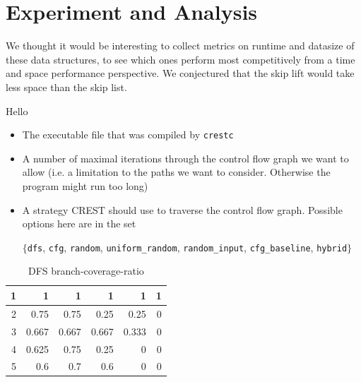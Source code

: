 \documentclass[oribibl]{llncs}
\begin{document}
 \section{Experiment and Analysis}
\label{sctn:experiment}

We thought it would be interesting to collect metrics on runtime and datasize of these data structures, to see which ones perform most competitively from a time and space performance perspective. We conjectured that the skip lift would take less space than the skip list.


\begin{remark}
Hello
\end{remark}

\begin{itemize}
  \item The executable file that was compiled by \texttt{crestc}
  \item A number of maximal iterations through the control flow graph
    we want to allow (i.e. a limitation to the paths we
    want to consider. Otherwise the program might run too long)
  \item A strategy \textsc{CREST} should use to traverse the control
    flow graph. Possible options here are in the set
\begin{center}
$\{$\texttt{dfs}, \texttt{cfg}, \texttt{random},
    \texttt{uniform\_random}, \texttt{random\_input}, 
    \texttt{cfg\_baseline}, \texttt{hybrid}$\}$
\end{center}
\end{itemize}


\begin{table}[htbp]
\caption{DFS branch-coverage-ratio}
\begin{center}
\begin{tabular}{|r|r|r|r|r|r|}
\hline
1 & 1 & 1 & 1 & 1 & 1 \\ \hline
2 & 0.75 & 0.75 & 0.25 & 0.25 & 0 \\ \hline
3 & 0.667 & 0.667 & 0.667 & 0.333 & 0 \\ \hline
4 & 0.625 & 0.75 & 0.25 & 0 & 0 \\ \hline
5 & 0.6 & 0.7 & 0.6 & 0 & 0 \\ \hline
\end{tabular}
\end{center}
\label{DFS timings (in seconds)}
\end{table}
\end{document}
